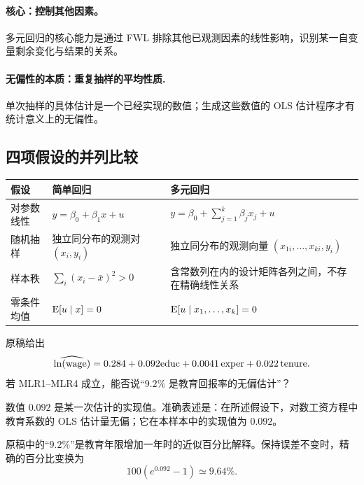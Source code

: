 \paragraph{核心：控制其他因素。}
多元回归的核心能力是通过 FWL 排除其他已观测因素的线性影响，识别某一自变量剩余变化与结果的关系。

\paragraph{无偏性的本质：重复抽样的平均性质.}
单次抽样的具体估计是一个已经实现的数值；生成这些数值的 OLS 估计程序才有统计意义上的无偏性。

\subsection{四项假设的并列比较}
\begin{center}
\small\renewcommand{\arraystretch}{1.35}
\begin{tabular}{P{3.1cm}P{5.35cm}P{6.3cm}}
\toprule
假设 & 简单回归 & 多元回归\\
\midrule
对参数线性 & $y=\beta_0+\beta_1x+u$ & $y=\beta_0+\sum_{j=1}^k\beta_jx_j+u$\\
随机抽样 & 独立同分布的观测对 $(x_i,y_i)$ & 独立同分布的观测向量 $(x_{1i},\ldots,x_{ki},y_i)$\\
样本秩 & $\sum_i(x_i-\bar x)^2>0$ & 含常数列在内的设计矩阵各列之间，不存在精确线性关系\\
零条件均值 & $\operatorname{E}[u\mid x]=0$ & $\operatorname{E}[u\mid x_1,\ldots,x_k]=0$\\
\bottomrule
\end{tabular}
\end{center}

\begin{example}[某次教育回报率估计]\label{ex:unbiased-number}
原稿给出
\[\widehat{\ln(\mathrm{wage})}
=0.284+0.092\mathrm{educ}+0.0041\,\mathrm{exper}+0.022\,\mathrm{tenure}.\]
若 MLR1--MLR4 成立，能否说“$9.2\%$ 是教育回报率的无偏估计”？

数值 $0.092$ 是某一次估计的实现值。准确表述是：在所述假设下，对数工资方程中教育系数的 OLS 估计量无偏；它在本样本中的实现值为 $0.092$。

原稿中的“$9.2\%$”是教育年限增加一年时的近似百分比解释。保持误差不变时，精确的百分比变换为
\[100(e^{0.092}-1)\simeq9.64\%.
\]
\end{example}

